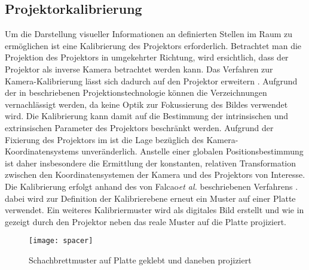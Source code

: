 \subsection{Projektorkalibrierung}
Um die Darstellung visueller Informationen an definierten Stellen im Raum zu ermöglichen ist eine Kalibrierung des Projektors erforderlich. Betrachtet man die Projektion des Projektors in umgekehrter Richtung, wird ersichtlich, dass der Projektor als inverse Kamera betrachtet werden kann. Das Verfahren zur Kamera-Kalibrierung lässt sich dadurch auf den Projektor erweitern \cite{Falcao2008}. Aufgrund der in  beschriebenen Projektionstechnologie können die Verzeichnungen vernachlässigt werden, da keine Optik zur Fokussierung des Bildes verwendet wird. Die Kalibrierung kann damit auf die Bestimmung der intrinsischen und extrinsischen Parameter des Projektors beschränkt werden. Aufgrund der Fixierung des Projektors im \kps{} ist die Lage bezüglich des Kamera-Koordinatensystems unveränderlich. Anstelle einer globalen Positionsbestimmung ist daher insbesondere die Ermittlung der konstanten, relativen Transformation zwischen den Koordinatensystemen der Kamera und des Projektors von Interesse.\\

Die Kalibrierung erfolgt anhand des von Falcao\red[Groß?] \textit{et al.} beschriebenen Verfahrens \cite{Falcao2008}. dabei wird zur Definition der Kalibrierebene erneut ein Muster auf einer Platte verwendet. Ein weiteres Kalibriermuster wird als digitales Bild erstellt und wie in  gezeigt durch den Projektor neben das reale Muster auf die Platte projiziert.

\begin{figure}[ht]
	\begin{center}
		\texttt{[image: spacer]}
		\caption{Schachbrettmuster auf Platte geklebt und daneben projiziert}
		\label{fig.projcalib}
	\end{center}
\end{figure}

